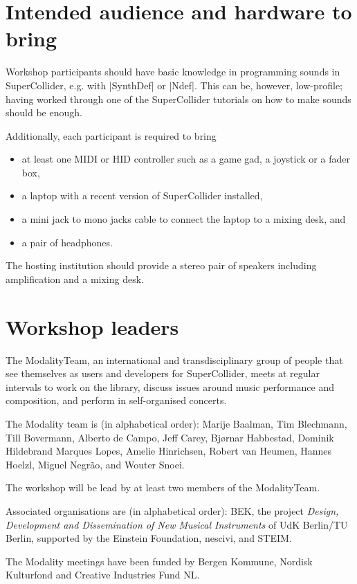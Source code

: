 \documentclass{article}
\begin{document}
\section{Intended audience and hardware to bring}
\label{sec:participants}

Workshop participants should have basic knowledge in programming sounds in SuperCollider, e.g. with |SynthDef| or |Ndef|. 
This can be, however, low-profile; having worked through one of the SuperCollider tutorials on how to make sounds should be enough.

Additionally, each participant is required to bring
\begin{itemize}\itemsep0em
	\item at least one MIDI or HID controller such as a game gad, a joystick or a fader box, 
	\item a laptop with a recent version of SuperCollider installed, 
	\item a mini jack to mono jacks cable to connect the laptop to a mixing desk, and
	\item a pair of headphones.
\end{itemize}

The hosting institution should provide a stereo pair of speakers including amplification and a mixing desk.


\section{Workshop leaders}
\label{sec:workshop_leaders}

The ModalityTeam, an international and transdisciplinary group of people that see themselves as users and developers for SuperCollider, meets at regular intervals to work on the library, discuss issues around music performance and composition, and perform in self-organised concerts.

The Modality team is (in alphabetical order):
    Marije Baalman,
    Tim Blechmann,
    Till Bovermann,
    Alberto de Campo,
    Jeff Carey,
    Bj\o{}rnar Habbestad,
    Dominik Hildebrand Marques Lopes,
    Amelie Hinrichsen,
    Robert van Heumen,
    Hannes Hoelzl,
    Miguel Negr\~{a}o, and
    Wouter Snoei.

The workshop will be lead by at least two members of the ModalityTeam.


\begin{acknowledgments}
Associated organisations are (in alphabetical order):
BEK,
the project \emph{Design, Development and Dissemination of New Musical Instruments} of UdK Berlin/TU Berlin, supported by the Einstein Foundation,
nescivi, and
STEIM.

The Modality meetings have been funded by Bergen Kommune, Nordisk Kulturfond and Creative Industries Fund NL.
\end{acknowledgments} 


\end{document}
